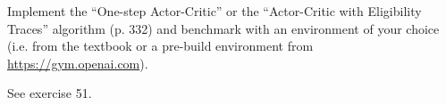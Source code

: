
\begin{exercise}

Implement the \enquote{One-step Actor-Critic} or the \enquote{Actor-Critic with Eligibility Traces} algorithm (p. 332) and benchmark with an environment of your choice (i.e. from the textbook or a pre-build environment from \href{https://gym.openai.com}{https://gym.openai.com}).

\end{exercise}


\begin{solution}

See exercise 51.

\end{solution}

